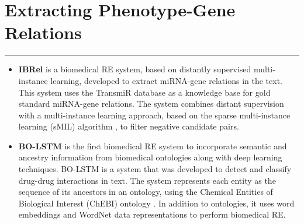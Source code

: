 \hypertarget{4}{}

\chapter{Extracting Phenotype-Gene Relations}


\vspace{-1.6cm}

\begingroup
\color{gray}
\par\noindent\rule{\textwidth}{0.4pt}
\endgroup


\begin{itemize}
   \item \textbf{IBRel} \citep{10.1371/journal.pone.0171929} is a biomedical RE system, based on distantly supervised multi-instance learning, developed to extract miRNA-gene relations in the text. This system uses the TransmiR database \citep{10.1093/nar/gkp803} as a knowledge base for gold standard miRNA-gene relations. The system combines distant supervision with a multi-instance learning approach, based on the sparse multi-instance learning (sMIL) algorithm \citep{Bunescu:2007:MIL:1273496.1273510}, to filter negative candidate pairs.
   \item \textbf{BO-LSTM} \citep{BOLSTM} is the first biomedical RE system to incorporate semantic and ancestry information from biomedical ontologies along with deep learning techniques. BO-LSTM is a system that was developed to detect and classify drug-drug interactions in text. The system represents each entity as the sequence of its ancestors in an ontology, using the Chemical Entities of Biological Interest (ChEBI) ontology \citep{CHEBI}. In addition to ontologies, it uses word embeddings and WordNet \citep{WORDNET} data representations to perform biomedical RE.
\end{itemize}

